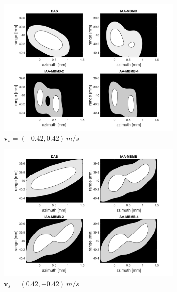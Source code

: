 \begin{figure}[ht]
\begin{subfigure}[t]{0.48\linewidth}
        \includegraphics[width=\linewidth]{./images/results/3/motion_-45_-06.png}
        \caption{$\boldsymbol{v}_s = (-0.42, 0.42)~m/s$}
        \label{fig:double_diag1}
    \end{subfigure}
    \quad
    \begin{subfigure}[t]{0.48\linewidth}
        \includegraphics[width=\linewidth]{./images/results/3/motion_-45_06.png}
        \caption{$\boldsymbol{v}_s = (0.42, -0.42)~m/s$}
    \end{subfigure}
    \quad
    \begin{subfigure}[t]{0.48\linewidth}

\end{subfigure}
\end{figure}
